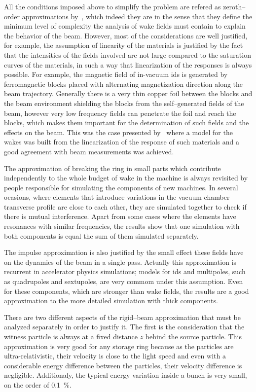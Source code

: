     All the conditions imposed above to simplify the problem are refered as zeroth--order approximations by~, which indeed they are in the sense that they define the minimum level of complexity the analysis of wake fields must contain to explain the behavior of the beam. However, most of the considerations are well justified, for example, the assumption of linearity of the materials is justified by the fact that the intensities of the fields involved are not large compared to the saturation curves of the materials, in such a way that linearization of the responses is always possible. For example, the magnetic field of in-vacuum \glspl{id} is generated by ferromagnetic blocks placed with alternating magnetization direction along the beam trajectory. Generally there is a very thin copper foil between the blocks and the beam environment shielding the blocks from the self--generated fields of the beam, however very low frequency fields can penetrate the foil and reach the blocks, which makes them important for the determination of such fields and the effects on the beam. This was the case presented by~ where a model for the wakes was built from the linearization of the response of such materials and a good agreement with beam measurements was achieved.

    The approximation of breaking the ring in small parts which contribute independently to the whole budget of wake in the machine is always revisited by people responsible for simulating the components of new machines. In several ocasions, where elements that introduce variations in the vacuum chamber transverse profile are close to each other, they are simulated together to check if there is mutual interference. Apart from some cases where the elements have resonances with similar frequencies, the results show that one simulation with both components is equal the sum of them simulated separately.

    The impulse approximation is also justified by the small effect these fields have on the dynamics of the beam in a single pass. Actually this approximation is recurrent in accelerator physics simulations; models for \glspl{id} and multipoles, such as quadrupoles and sextupoles, are very commom under this assumption. Even for these components, which are stronger than wake fields, the results are a good approximation to the more detailed simulation with thick components.

    There are two different aspects of the rigid--beam approximation that must be analyzed separately in order to justify it. The first is the consideration that the witness particle is always at a fixed distance $z$ behind the source particle. This approximation is very good for any storage ring because as the particles are ultra-relativistic, their velocity is close to the light speed and even with a considerable energy difference between the particles, their velocity difference is negligible. Additionaly, the typical energy variation inside a bunch is very small, on the order of \SI{0.1}{\percent}.

